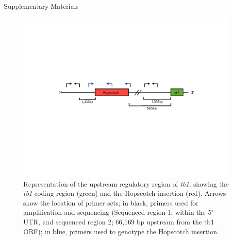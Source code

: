 \documentclass[12pt]{article}
\newcommand{\lev}[1]{\textcolor{green}{\emph{\scriptsize #1}} }
\begin{document}

\clearpage


Supplementary Materials
\clearpage
\setcounter{figure}{0}
\setcounter{table}{0}
\renewcommand{\figurename}{Sup.\Fig.}
\renewcommand{\tablename}{Sup.\Table}

\begin{figure}[!t]
  \begin{center}
   \includegraphics[width=150mm]{FigS1LocusCartoon.pdf}
    \caption{Representation of the upstream regulatory region of \emph{tb1}, showing the \emph{tb1} coding region (green) and the Hopscotch insertion (red). Arrows show the location of primer sets; in black, primers used for amplification and sequencing (Sequenced region 1; within the 5' UTR, and sequenced region 2; 66,169 bp upstream from the tb1 ORF); in blue, primers used to genotype the Hopscotch insertion.} 
\label{FigS1Locus}
  \end{center}
\end{figure}
\end{document}
